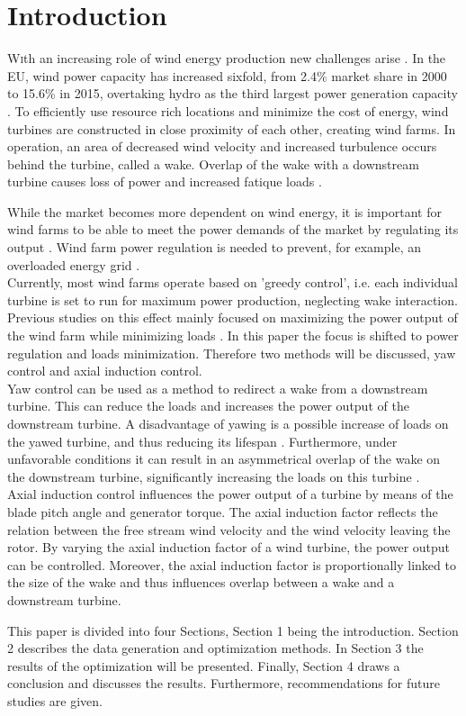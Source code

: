 \section{Introduction}
\lettrine[nindent=0em,lines=3]
With an increasing role of wind energy production new challenges arise \cite{Nat2016}. In the EU, wind power capacity has increased sixfold, from 2.4\% market share in 2000 to 15.6\% in 2015, overtaking hydro as the third largest power generation capacity \cite{EWEA2016}. To efficiently use resource rich locations and minimize the cost of energy, wind turbines are constructed in close proximity of each other, creating wind farms. In operation, an area of decreased wind velocity and increased turbulence occurs behind the turbine, called a wake. Overlap of the wake with a downstream turbine causes loss of power and increased fatique loads \cite{Boersma2017, Wilson2017, Dijk2016, Fleming2014, Zalkind2016}. 

While the market becomes more dependent on wind energy, it is important for wind farms to be able to meet the power demands of the market by regulating its output \cite{Tande2003}. Wind farm power regulation is needed to prevent, for example, an overloaded energy grid \cite{Hansen2014}.  \\
\indent Currently, most wind farms operate based on 'greedy control', i.e. each individual turbine is set to run for maximum power production, neglecting wake interaction. Previous studies on this effect mainly focused on maximizing the power output of the wind farm while minimizing loads \cite{Wilson2017, Dijk2016, vanDijk2016}. In this paper the focus is shifted to power regulation and loads minimization. Therefore two methods will be discussed, yaw control and axial induction control. \\
\indent Yaw control can be used as a method to redirect a wake from a downstream turbine. This can reduce the loads and increases the power output of the downstream turbine. A disadvantage of yawing is a possible increase of loads on the yawed turbine, and thus reducing its lifespan \cite{Zalkind2016,Kanev2017}. Furthermore, under unfavorable conditions it can result in an asymmetrical overlap of the wake on the downstream turbine, significantly increasing the loads on this turbine \cite{Wilson2017,Dijk2016}. \\
\indent Axial induction control influences the power output of a turbine by means of the blade pitch angle and generator torque. The axial induction factor reflects the relation between the free stream wind velocity and the wind velocity leaving the rotor. By varying the axial induction factor of a wind turbine, the power output can be controlled. Moreover, the axial induction factor is proportionally linked to the size of the wake and thus influences overlap between a wake and a downstream turbine.  

This paper is divided into four Sections, Section 1 being the introduction. Section 2 describes the data generation and optimization methods. In Section 3 the results of the optimization will be presented. Finally, Section 4 draws a conclusion and discusses the results. Furthermore, recommendations for future studies are given.
